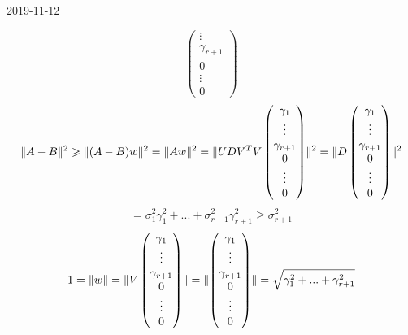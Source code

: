 \documentclass[main.tex]{subfiles}
\begin{document}
\begin{lect}{2019-11-12}
\begin{Proof}
\[\begin{pmatrix}
            \vdots\\
            \gamma_{r + 1}\\
            0\\
            \vdots\\
            0
        \end{pmatrix}\]
        \[\lVert A - B \rVert^2 \geqslant \lVert (A - B)w \rVert^2 = \lVert Aw \rVert^2 = \lVert UDV^{T}V \begin{pmatrix}
            \gamma_1\\
            \vdots\\
            \gamma_{r + 1}\\
            0\\
            \vdots\\
            0
        \end{pmatrix} \rVert^2 = \lVert D \begin{pmatrix}
            \gamma_1\\
            \vdots\\
            \gamma_{r + 1}\\
            0\\
            \vdots\\
            0
        \end{pmatrix} \rVert^2\]
        \[= \sigma_1^2 \gamma_1^2 + ... + \sigma_{r + 1}^2 \gamma_{r + 1}^2 \geq 
        \sigma_{r + 1}^2 \]
        \[1 = \lVert w \rVert = \lVert V \begin{pmatrix}
            \gamma_1\\
            \vdots\\
            \gamma_{r + 1}\\
            0\\
            \vdots\\
            0
        \end{pmatrix} \rVert = \lVert \begin{pmatrix}
            \gamma_1\\
            \vdots\\
            \gamma_{r + 1}\\
            0\\
            \vdots\\
            0
        \end{pmatrix} \rVert = \sqrt{\gamma_1^2 + ... + \gamma_{r + 1}^2} \]
    \end{Proof}


\end{lect}
\end{document}
